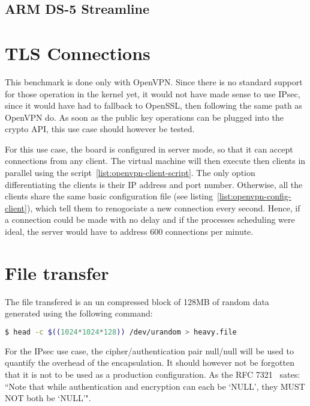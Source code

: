 \subsection{ARM DS-5 Streamline}

\section{TLS Connections}
This benchmark is done only with OpenVPN.
Since there is no standard support for those operation in the kernel yet, it would not have made sense to use IPsec, since it would have had to fallback to OpenSSL, then following the same path as OpenVPN do.
As soon as the public key operations can be plugged into the crypto API, this use case should however be tested.

For this use case, the board is configured in server mode, so that it can accept connections from any client.
The virtual machine will then execute then clients in parallel using the script~\ref{list:openvpn-client-script}.
The only option differentiating the clients is their IP address and port number.
Otherwise, all the clients share the same basic configuration file (see listing~\ref{list:openvpn-config-client}), which tell them to renogociate a new connection every second.
Hence, if a connection could be made with no delay and if the processes scheduling were ideal, the server would have to address 600 connections per minute.



\section{File transfer}
The file transfered is an un compressed block of 128MB of random data generated using the following command:
\begin{lstlisting}[language=bash]
  $ head -c $((1024*1024*128)) /dev/urandom > heavy.file
\end{lstlisting}

For the IPsec use case, the cipher/authentication pair null/null will be used to quantify the overhead of the encapsulation.
It should however not be forgotten that it is not to be used as a production configuration.
As the RFC 7321~\citep[pg. 7]{rfc7321} sates: ``Note that while authentication and encryption can each
   be `NULL', they MUST NOT both be `NULL'".
